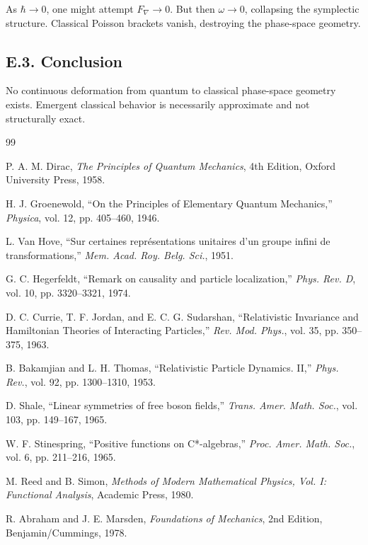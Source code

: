 \documentclass[12pt,oneside]{book}
\theoremstyle{plain}
\theoremstyle{definition}
\begin{document}
As $\hbar \to 0$, one might attempt $F_\nabla \to 0$. But then $\omega \to 0$, collapsing the symplectic structure. Classical Poisson brackets vanish, destroying the phase-space geometry.

\subsection*{E.3. Conclusion}

No continuous deformation from quantum to classical phase-space geometry exists. Emergent classical behavior is necessarily approximate and not structurally exact.


\begin{thebibliography}{99}

P. A. M. Dirac, \emph{The Principles of Quantum Mechanics}, 4th Edition, Oxford University Press, 1958.

H. J. Groenewold, ``On the Principles of Elementary Quantum Mechanics,'' \emph{Physica}, vol. 12, pp. 405–460, 1946.

L. Van Hove, ``Sur certaines représentations unitaires d’un groupe infini de transformations,'' \emph{Mem. Acad. Roy. Belg. Sci.}, 1951.

G. C. Hegerfeldt, ``Remark on causality and particle localization,'' \emph{Phys. Rev. D}, vol. 10, pp. 3320–3321, 1974.

D. C. Currie, T. F. Jordan, and E. C. G. Sudarshan, ``Relativistic Invariance and Hamiltonian Theories of Interacting Particles,'' \emph{Rev. Mod. Phys.}, vol. 35, pp. 350–375, 1963.

B. Bakamjian and L. H. Thomas, ``Relativistic Particle Dynamics. II,'' \emph{Phys. Rev.}, vol. 92, pp. 1300–1310, 1953.

D. Shale, ``Linear symmetries of free boson fields,'' \emph{Trans. Amer. Math. Soc.}, vol. 103, pp. 149–167, 1965.

W. F. Stinespring, ``Positive functions on C*-algebras,'' \emph{Proc. Amer. Math. Soc.}, vol. 6, pp. 211–216, 1965.

M. Reed and B. Simon, \emph{Methods of Modern Mathematical Physics, Vol. I: Functional Analysis}, Academic Press, 1980.

R. Abraham and J. E. Marsden, \emph{Foundations of Mechanics}, 2nd Edition, Benjamin/Cummings, 1978.


\end{thebibliography}
\end{document}
